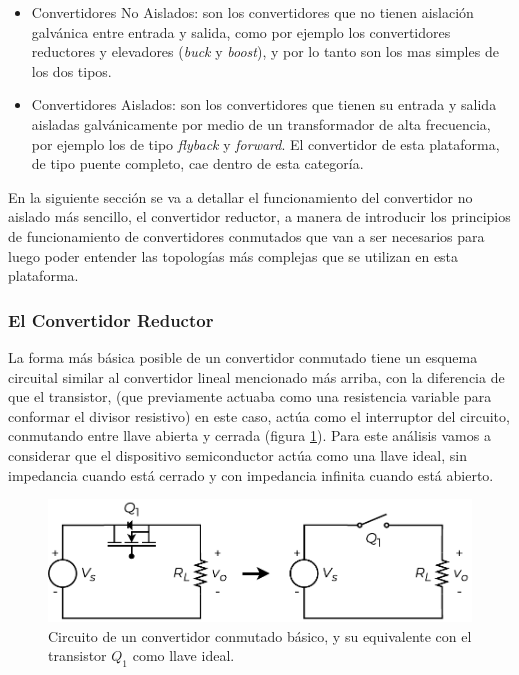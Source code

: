 \begin{itemize}
    \item {\SemiBold Convertidores No Aislados:} son los convertidores que no tienen aislación galvánica entre entrada y salida, como por ejemplo los convertidores reductores y elevadores (\textit{buck} y \textit{boost}), y por lo tanto son los mas simples de los dos tipos.
    \item {\SemiBold Convertidores Aislados:} son los convertidores que tienen su entrada y salida aisladas galvánicamente por medio de un transformador de alta frecuencia, por ejemplo los de tipo \textit{flyback} y \textit{forward}. El convertidor de esta plataforma, de tipo puente completo, cae dentro de esta categoría.
\end{itemize}

En la siguiente sección se va a detallar el funcionamiento del convertidor no aislado más sencillo, el convertidor reductor, a manera de introducir los principios de funcionamiento de convertidores conmutados que van a ser necesarios para luego poder entender las topologías más complejas que se utilizan en esta plataforma.\\

\subsubsection{El Convertidor Reductor}

La forma más básica posible de un convertidor conmutado tiene un esquema circuital similar al convertidor lineal mencionado más arriba, con la diferencia de que el transistor, (que previamente actuaba como una resistencia variable para conformar el divisor resistivo) en este caso, actúa como el interruptor del circuito, conmutando entre llave abierta y cerrada (figura \ref{proto_reductor}). Para este análisis vamos a considerar que el dispositivo semiconductor actúa como una llave ideal, sin impedancia cuando está cerrado y con impedancia infinita cuando está abierto.\\

\begin{figure}[h]
    \centering
    \includegraphics[scale=0.6]{Imagenes/Proto Reductor.pdf}
    \caption{Circuito de un convertidor conmutado básico, y su equivalente con el transistor $Q_1$ como llave ideal.}
    \label{proto_reductor}
\end{figure}

